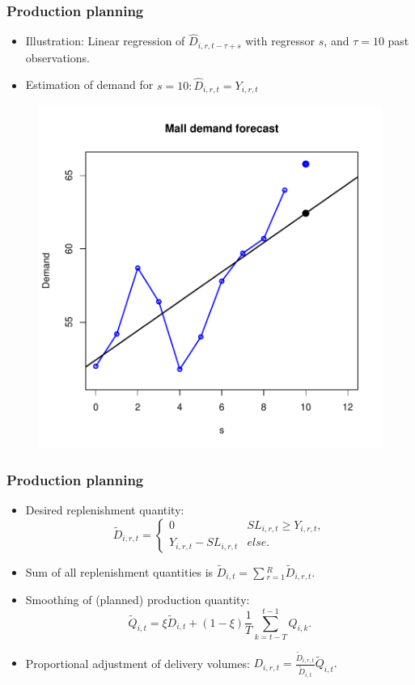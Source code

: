 \documentclass{beamer}
\begin{document}
\frame
{
 \frametitle{Production planning}
 
\begin{itemize}
	\item  Illustration: Linear regression of  $\hat{D}_{i,r,t-\tau+ s}$ with regressor $s$, and $\tau=10$ past observations. 
	\item Estimation of demand for $s=10:  \hat{D}_{i,r,t}=Y_{i,r,t}$ 
\end{itemize}
   
\begin{figure}
\centering
\includegraphics[scale=0.3]{regression.pdf}
\label{fig:regression}
\end{figure}



}


\frame
{
  \frametitle{Production planning} 
\begin{itemize}

\item Desired replenishment quantity:
	\[
			\tilde{D}_{i,r,t}= \begin{cases} 0 & SL_{i,r,t}\geq Y_{i,r,t},\\
																			Y_{i,r,t} -  SL_{i,r,t} &else. 
			
			 \end{cases}
	\]

	\item Sum of all replenishment quantities is $\tilde{D}_{i,t}=\sum{}_{r=1}^R \tilde{D}_{i,r,t}.$
	
	\item Smoothing of (planned) production quantity: 
	 \[
	 \tilde{Q}_{i,t}=\xi \tilde{D}_{i,t} + (1-\xi)\frac{1}{T}\sum_{k=t-T}^{t-1}Q_{i,k}.
	 \]
	
	\item Proportional adjustment of delivery volumes: $D_{i,r,t}=\frac{ \tilde{D}_{i,r,t}}{\tilde{D}_{i,t}}\tilde{Q}_{i,t}.$
	\end{itemize}


}
\end{document}
